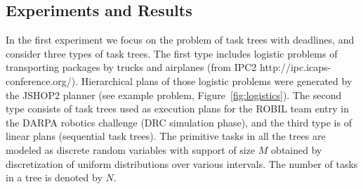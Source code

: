 \documentclass{article}
\begin{document}
\subsection{Experiments and Results}
In the first experiment we focus on the problem of task trees with deadlines, and consider three types of task trees.
The first type includes logistic problems of transporting packages by trucks and airplanes (from IPC2 http://ipc.icaps-conference.org/). Hierarchical plans of those logistic problems were generated by the JSHOP2 planner \cite{nau2003shop2} (see example problem, Figure~\ref{fig:logistics}). 
The second type consists of task trees used as execution plans for the ROBIL team entry in the DARPA robotics challenge (DRC simulation phase), and the third type is of linear plans (sequential task trees).
The primitive tasks in all the trees are modeled as discrete random variables with support of size $M$ obtained by discretization of uniform distributions over various intervals. The number of tasks in a tree is denoted by $N$. 
\end{document}

